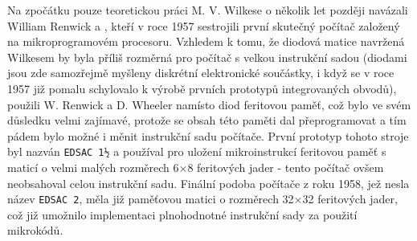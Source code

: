         Na zpočátku pouze teoretickou práci M. V. Wilkese o několik let později navázali William 
        Renwick a \wikiWheeler, kteří v roce 1957 sestrojili první skutečný počítač založený na 
        mikroprogramovém procesoru. Vzhledem k tomu, že diodová matice navržená Wilkesem by byla 
        příliš rozměrná pro počítač s velkou instrukční sadou (diodami jsou zde samozřejmě myšleny 
        diskrétní elektronické součástky, i když se v roce 1957 již pomalu schylovalo k výrobě 
        prvních prototypů integrovaných obvodů), použili W. Renwick a D. Wheeler namísto diod 
        feritovou paměť, což bylo ve svém důsledku velmi zajímavé, protože se obsah této paměti dal 
        přeprogramovat a tím pádem bylo možné i měnit instrukční sadu počítače. První prototyp 
        tohoto stroje byl nazván \texttt{EDSAC 1½} a používal pro uložení mikroinstrukcí feritovou 
        paměť s maticí o velmi malých rozměrech 6×8 feritových jader - tento počítač ovšem 
        neobsahoval celou instrukční sadu. Finální podoba počítače z roku 1958, jež nesla název 
        \texttt{EDSAC 2}, měla již paměťovou matici o rozměrech 32×32 feritových jader, což již 
        umožnilo implementaci plnohodnotné instrukční sady za použití mikrokódů.
    
